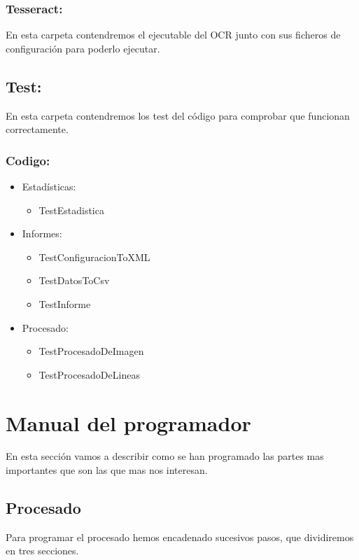 \subsubsection{Tesseract:}
En esta carpeta contendremos el ejecutable del OCR junto con sus ficheros de configuración para poderlo ejecutar.

\subsection{Test:}
En esta carpeta contendremos los test del código para comprobar que funcionan correctamente.
\subsubsection{Codigo:}
\begin{itemize}
	\item Estadísticas:
		\begin{itemize}
			\item TestEstadistica
		\end{itemize}
	\item Informes:
		\begin{itemize}
			\item TestConfiguracionToXML
			\item TestDatosToCsv
			\item TestInforme
		\end{itemize}
	\item Procesado:
		\begin{itemize}
			\item TestProcesadoDeImagen
			\item TestProcesadoDeLineas
		\end{itemize}
\end{itemize}

\section{Manual del programador}
En esta sección vamos a describir como se han programado las partes mas importantes que son las que mas nos interesan.
\subsection{Procesado}
Para programar el procesado hemos encadenado sucesivos pasos, que dividiremos en tres secciones.

